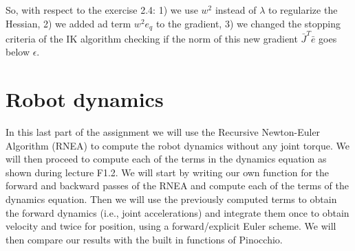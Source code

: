 \documentclass[11pt]{article}
\begin{document}

So, with respect to the exercise 2.4: 1) we use $w^2$ instead of $\lambda $ to regularize the Hessian, 2) we added ad term $w^2 e_q $ to the gradient, 3) we changed the stopping criteria of the IK algorithm checking if the norm of this new gradient $\bar{J}^T\bar{e}$ goes below $\epsilon$.\\

\section{Robot dynamics}

In this last part of the assignment we will use the Recursive Newton-Euler Algorithm (RNEA) to compute the robot dynamics without any joint torque. We will then proceed to compute each of the terms in the dynamics equation as shown during lecture F1.2. We will start by writing our own function for the forward and backward passes of the RNEA and compute each of the terms of the dynamics equation. Then we will use the previously computed terms to obtain the forward dynamics (i.e., joint accelerations) and integrate them once to obtain velocity and twice  for position, using a forward/explicit Euler scheme. We will then compare our results with the built in functions of Pinocchio.
\end{document}
